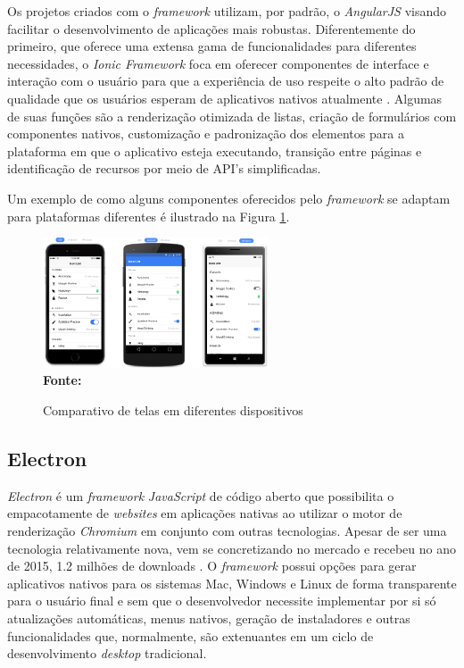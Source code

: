 Os projetos criados com o \textit{framework} utilizam, por padrão, o \textit{AngularJS} visando facilitar o desenvolvimento de aplicações mais robustas. Diferentemente do primeiro, que oferece uma extensa gama de funcionalidades para diferentes necessidades, o \textit{Ionic Framework} foca em oferecer componentes de interface e interação com o usuário para que a experiência de uso respeite o alto padrão de qualidade que os usuários esperam de aplicativos nativos atualmente \cite{ionicFIT}. Algumas de suas funções são a renderização otimizada de listas, criação de formulários com componentes nativos, customização e padronização dos elementos para a plataforma em que o aplicativo esteja executando, transição entre páginas e identificação de recursos por meio de API's simplificadas.

Um exemplo de como alguns componentes oferecidos pelo \textit{framework} se adaptam para plataformas diferentes é ilustrado na Figura \ref{fig:figura1}.

\begin{figure}[ht]
	\centering	
	\caption[\hspace{0.1cm}Comparativo de telas em diferentes dispositivos.]{Comparativo de telas em diferentes dispositivos}
	\vspace{-0.4cm}
	\includegraphics[width=0.6\textwidth]{figuras/ComparativodeTelasIonic.png}
	\vspace{-0.2cm}
	\\\textbf{\footnotesize Fonte: \cite{pressman2011} }
	\label{fig:figura1}
\end{figure}
\vspace{-0.5cm}


\subsection{\esp Electron}

\textit{Electron} é um \textit{framework} \textit{JavaScript} de código aberto que possibilita o empacotamente de \textit{websites} em aplicações nativas ao utilizar o motor de renderização \textit{Chromium} em conjunto com outras tecnologias. Apesar de ser uma tecnologia relativamente nova, vem se concretizando no mercado e recebeu no ano de 2015, 1.2 milhões de downloads \cite{electron}. O \textit{framework} possui opções para gerar aplicativos nativos para os sistemas Mac, Windows e Linux de forma transparente para o usuário final e sem que o desenvolvedor necessite implementar por si só atualizações automáticas, menus nativos, geração de instaladores e outras funcionalidades que, normalmente, são extenuantes em um ciclo de desenvolvimento \textit{desktop} tradicional. \cite{electron}

